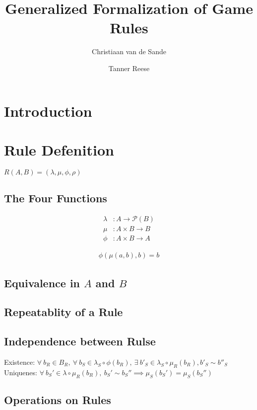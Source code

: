 \documentclass{article}
\title{Generalized Formalization of Game Rules}
\author{Christiaan van de Sande \and Tanner Reese}
\begin{document}
\maketitle

\section{Introduction}


\section{Rule Defenition}

$ R (A, B) = ( \lambda, \mu, \phi, \rho ) $

\subsection{The Four Functions}

\begin{align*}
  \lambda & : A \rightarrow \mathcal{P} (B) \\
      \mu & : A \times B \rightarrow B  \\
     \phi & : A \times B \rightarrow A 
\end{align*}

\begin{align*}
  \phi ( \mu (a, b), b) = b
\end{align*}

\subsection{Equivalence in $ A $ and $ B $ }

\subsection{Repeatablity of a Rule}

\subsection{Independence between Rulse}

Existence: $ \forall ~ b_R \in B_R, ~ \forall ~ b_S \in \lambda_S \circ \phi (b_R), ~ \exists ~ b'_S \in \lambda_S \circ \mu_R (b_R), b'_S \sim b''_S $ \\
Uniquenes: $ \forall ~ b_S' \in \lambda \circ \mu_R (b_R), ~ b_S' \sim  b_S'' \implies \mu_S (b_S') = \mu_S (b_S'') $

\subsection{Operations on Rules}
\end{document}
